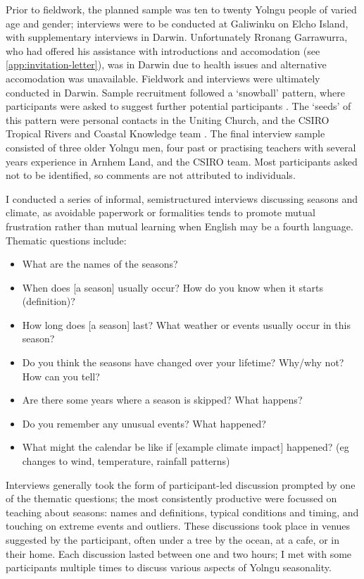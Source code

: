 Prior to fieldwork, the planned sample was ten to twenty Yolngu people
of varied age and gender; interviews were to be conducted at Galiwinku
on Elcho Island, with supplementary interviews in Darwin.  Unfortunately
Rronang Garrawurra, who had offered his assistance with introductions
and accomodation (see \cref{app:invitation-letter}), was in Darwin due
to health issues and alternative accomodation was unavailable.
%
Fieldwork and interviews were ultimately conducted in Darwin.  Sample
recruitment followed a `snowball' pattern, where participants were asked
to suggest further potential participants \citep{patrick1996}.  The `seeds'
of this pattern were personal contacts in the Uniting Church, and the
CSIRO Tropical Rivers and Coastal Knowledge team \citep{CSIROcals}.
%
The final interview sample consisted of three older Yolngu men, four past
or practising teachers with several years experience in Arnhem Land, and
the CSIRO team.  Most participants asked not to be identified, so comments
are not attributed to individuals.


I conducted a series of informal, semistructured interviews discussing seasons
and climate, as avoidable paperwork or formalities tends to promote mutual
frustration rather than mutual learning when English may be a fourth language.
Thematic questions include:
\begin{itemize}
\item What are the names of the seasons?
\item When does [a season] usually occur?  How do you know when it starts (definition)?
\item How long does [a season] last?  What weather or events usually occur in this season?
\item Do you think the seasons have changed over your lifetime?  Why/why not?  How can you tell?
\item Are there some years where a season is skipped?  What happens?
\item Do you remember any unusual events?  What happened?
\item What might the calendar be like if [example climate impact] happened?
      (eg changes to wind, temperature, rainfall patterns)
\end{itemize}

Interviews generally took the form of participant-led discussion prompted
by one of the thematic questions; the most consistently productive were
focussed on teaching about seasons: names and definitions, typical conditions
and timing, and touching on extreme events and outliers.
%
These discussions took place in venues suggested by the participant, often
under a tree by the ocean, at a cafe, or in their home.  Each discussion
lasted between one and two hours; I met with some participants multiple times
to discuss various aspects of Yolngu seasonality.

